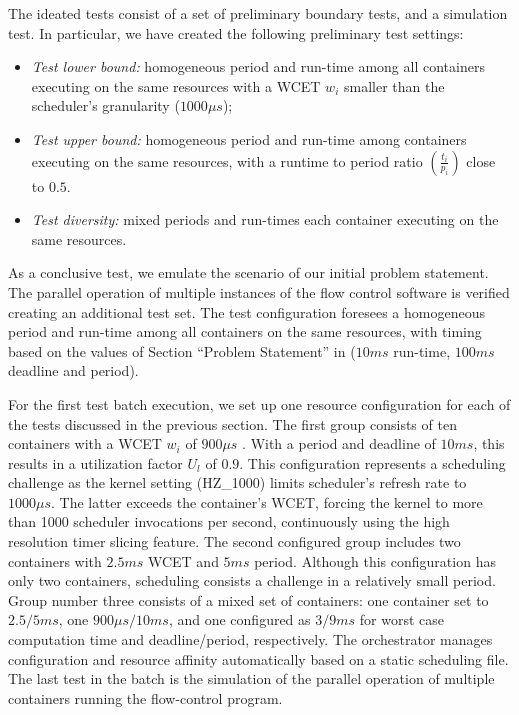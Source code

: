 \documentclass[]{scrartcl}
\begin{document}
The ideated tests consist of a set of preliminary boundary tests, and a simulation test.
In particular, we have created the following preliminary test settings:
\begin{itemize}
	\item \textit{Test lower bound:} homogeneous period and run-time among all containers executing on the same resources with a WCET $w_i$ smaller than the scheduler's granularity ($1000\mu s$);
	\item \textit{Test upper bound:} homogeneous period and run-time among containers executing on the same resources, with a runtime to period ratio $(\frac{t_i}{p_i})$ close to $0.5$.
	\item \textit{Test diversity:} mixed periods and run-times each container executing on the same resources.
\end{itemize}
As a conclusive test, we emulate the scenario of our initial problem statement. 
The parallel operation of multiple instances of the flow control software is verified creating an additional test set.
The test configuration foresees a homogeneous period and run-time among all containers on the same resources, with timing based on the values of Section ``Problem Statement'' in \cite{Hoferetal2019} ($10ms$ run-time, $100ms$ deadline and period).

For the first test batch execution, we set up one resource configuration for each of the tests discussed in the previous section.
The first group consists of ten containers with a WCET $w_i$ of $900\mu s$ . 
With a period and deadline of $10ms$, this results in a utilization factor $U_l$ of $0.9$.
This configuration represents a scheduling challenge as the kernel setting (HZ\_1000) limits scheduler's refresh rate to $1000\mu s$. 
The latter exceeds the container's WCET, forcing the kernel to more than 1000 scheduler invocations per second, continuously using the high resolution timer slicing feature.
The second configured group includes two containers with %
$2.5ms$ WCET and $5ms$ period.
Although this configuration has only two containers, scheduling consists a challenge in a relatively small period.
Group number three consists of a mixed set of containers: one container set to $2.5/5ms$, one $900\mu s/10ms$, and one configured as $3/9ms$ for worst case computation time and deadline/period, respectively.
The orchestrator manages configuration and resource affinity automatically based on a static scheduling file.
The last test in the batch is the simulation of the parallel operation of multiple containers running the flow-control program. 
\end{document}
